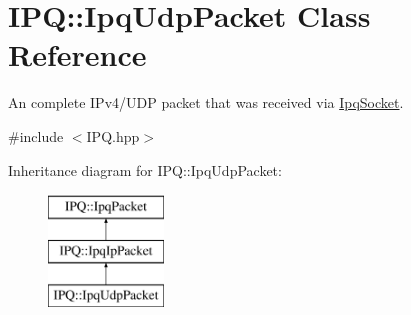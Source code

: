 \hypertarget{classIPQ_1_1IpqUdpPacket}{
\section{\-I\-P\-Q\-:\-:\-Ipq\-Udp\-Packet \-Class \-Reference}
\label{classIPQ_1_1IpqUdpPacket}
}


\-An complete \-I\-Pv4/\-U\-D\-P packet that was received via \hyperlink{classIPQ_1_1IpqSocket}{\-Ipq\-Socket}.  




{\ttfamily \#include $<$\-I\-P\-Q.\-hpp$>$}

\-Inheritance diagram for \-I\-P\-Q\-:\-:\-Ipq\-Udp\-Packet\-:\begin{figure}[H]
\begin{center}
\leavevmode
\includegraphics[height=3.000000cm]{classIPQ_1_1IpqUdpPacket}
\end{center}
\end{figure}
